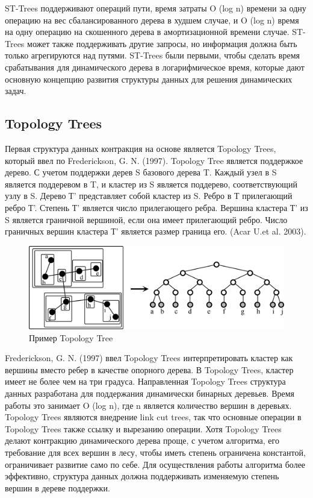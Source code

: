 \documentclass[specification,annotation,times]{itmo-student-thesis}
\newcommand{\revise}[1]{{\color{red!70!black} #1 }}
\begin{document}
\revise{
ST-Trees поддерживают операций пути, время затраты O (log n) времени за одну операцию на вес сбалансированного дерева в худшем случае, и O (log n) время на одну операцию на скошенного дерева в 
амортизационной времени случае. ST-Trees может также поддерживать другие запросы, но информация должна быть только агрегируются над путями. 
ST-Trees были первыми, чтобы сделать время срабатывания для динамического дерева в логарифмическое время, которые дают основную концепцию развития структуры данных для решения динамических задач.
}

\subsection{Topology Trees}

\revise{
Первая структура данных контракция на основе является Topology Trees, который ввел по Frederickson, G. N. (1997). Topology Tree является поддержкое дерево.
С учетом поддержки дерев S базового дерева T. Каждый узел в S является поддеревом в T, и кластер из S является поддерево, соответствующий узлу в S. Дерево Т' представляет собой кластер из S. Ребро в Т 
прилегающий ребро Т'. Степень Т' является число прилегающего ребра. Вершина кластера Т' из S является граничной вершиной, если она имеет прилегающий ребро. Число граничных вершин кластера Т' является 
размер граница его. (Acar U.et al. 2003).
}

\begin{figure}[!ht]
\centering
\includegraphics[width=\textwidth]{pic/topology-tree.png}
\caption{Пример Topology Tree}\label{fig:topology-tree}
\end{figure}

\revise{
Frederickson, G. N. (1997) ввел Topology Trees интерпретировать кластер как вершины вместо ребер в качестве опорного дерева. В Topology Trees, кластер имеет не более чем на три градуса. Направленная 
Topology Trees структура данных разработана для поддержания динамически бинарных деревьев. Время работы это занимает O (log n), где n является количество вершин в деревьях. Topology Trees являются 
внедрение link cut trees, так что основные операции в Topology Trees также ссылку и вырезанию операции. 
Хотя Topology Trees делают контракцию динамического дерева проще, с учетом алгоритма, его требование для всех вершин в лесу, чтобы иметь степень ограничена константой, ограничивает развитие само по себе. 
Для осуществления работы алгоритма более эффективно, структура данных должна поддерживать изменяемую степень вершин в дереве поддержки.
}
\end{document}
